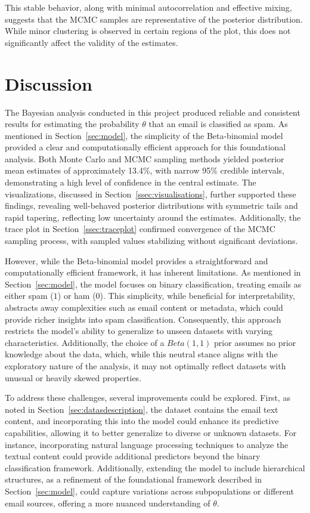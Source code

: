 \documentclass[12pt,a4paper]{article}
\begin{document}
This stable behavior, along with minimal autocorrelation and effective mixing, suggests that the MCMC samples
are representative of the posterior distribution. While minor clustering is observed in certain regions of
the plot, this does not significantly affect the validity of the estimates.

\section{Discussion}\label{sec:discussion}

The Bayesian analysis conducted in this project produced reliable and consistent results for estimating the
probability $\theta$ that an email is classified as spam. As mentioned in Section~\ref{sec:model}, the
simplicity of the Beta-binomial model provided a clear and computationally efficient approach for this
foundational analysis. Both Monte Carlo and MCMC sampling methods yielded posterior mean estimates of
approximately 13.4\%, with narrow 95\% credible intervals, demonstrating a high level of confidence in the
central estimate. The visualizations, discussed in Section~\ref{ssec:visualisations}, further supported these
findings, revealing well-behaved posterior distributions with symmetric tails and rapid tapering, reflecting
low uncertainty around the estimates. Additionally, the trace plot in Section~\ref{ssec:traceplot} confirmed
convergence of the MCMC sampling process, with sampled values stabilizing without significant deviations.

However, while the Beta-binomial model provides a straightforward and computationally efficient framework,
it has inherent limitations. As mentioned in Section~\ref{sec:model}, the model focuses on binary
classification, treating emails as either spam ($1$) or ham ($0$). This simplicity, while beneficial
for interpretability, abstracts away complexities such as email content or metadata, which could provide
richer insights into spam classification. Consequently, this approach restricts the model's ability to
generalize to unseen datasets with varying characteristics. Additionally, the choice of a $Beta(1,1)$ prior
assumes no prior knowledge about the data, which, while this neutral stance aligns with the exploratory
nature of the analysis, it may not optimally reflect datasets with unusual or heavily skewed properties.

To address these challenges, several improvements could be explored. First, as noted in
Section~\ref{sec:datasdescription}, the dataset contains the email text content, and incorporating this
into the model could enhance its predictive capabilities, allowing it to better generalize to diverse or
unknown datasets. For instance, incorporating natural language processing techniques to analyze the textual
content could provide additional predictors beyond the binary classification framework. Additionally,
extending the model to include hierarchical structures, as a refinement of the foundational framework
described in Section~\ref{sec:model}, could capture variations across subpopulations or different
email sources, offering a more nuanced understanding of $\theta$.
\end{document}
